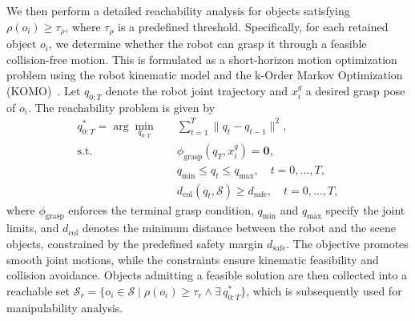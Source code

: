\documentclass[letterpaper, 10 pt, conference]{ieeeconf}  %
\begin{document}
We then perform a detailed reachability analysis for objects satisfying $\rho(o_i)\geq \tau_{\rho}$, where $\tau_{\rho}$ is a predefined threshold. 
Specifically, for each retained object $o_i$, we determine whether the robot can grasp it through a feasible collision-free motion. 
This is formulated as a short-horizon motion optimization problem using the robot kinematic model and the k-Order Markov Optimization (KOMO)~\cite{toussaint2014newton}.
Let $q_{0:T}$ denote the robot joint trajectory and $x_i^{g}$ a desired grasp pose of $o_i$. 
The reachability problem is given by
\begin{align}
q^{*}_{0:T} = \arg\min_{q_{0:T}} \quad & \sum_{t=1}^{T} \|q_{t}- q_{t-1}\|^{2}, \\ 
\mathrm{s.t.} \quad  & \phi_{\mathrm{grasp}}(q_{T},x_i^{g})=\mathbf{0}, \\
& q_{\min}\leq q_{t}\leq q_{\max}, \quad t=0,\ldots,T, \\
& d_{\mathrm{col}}(q_{t}, \mathcal{S})\geq d_{\mathrm{safe}}, \quad t=0,\ldots,T,
\end{align}
where $\phi_{\mathrm{grasp}}$ enforces the terminal grasp condition, $q_{\min}$ and $q_{\max}$ specify the joint limits, and $d_{\mathrm{col}}$ denotes the minimum distance between the robot and the scene objects, constrained by the predefined safety margin $d_{\mathrm{safe}}$.
The objective promotes smooth joint motions, while the constraints ensure kinematic feasibility and collision avoidance. 
Objects admitting a feasible solution are then collected into a reachable set $\mathcal{S}_{r} = \{ o_i \in \mathcal{S} \mid \rho(o_i)\ge\tau_r \wedge   \exists \, q^{*}_{0:T} \}$, which is subsequently used for manipulability analysis.



\end{document}
